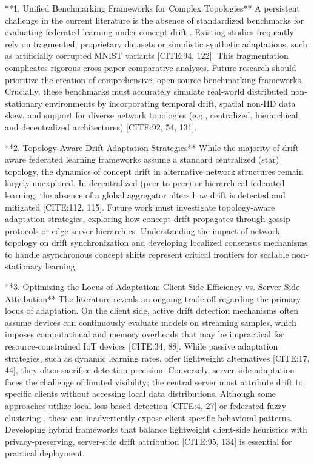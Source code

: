 \documentclass[journal]{IEEEtran}
\begin{document}
**1. Unified Benchmarking Frameworks for Complex Topologies**
A persistent challenge in the current literature is the absence of standardized benchmarks for evaluating federated learning under concept drift \cite{Mahdi2025}. Existing studies frequently rely on fragmented, proprietary datasets or simplistic synthetic adaptations, such as artificially corrupted MNIST variants [CITE:94, 122]. This fragmentation complicates rigorous cross-paper comparative analyses. Future research should prioritize the creation of comprehensive, open-source benchmarking frameworks. Crucially, these benchmarks must accurately simulate real-world distributed non-stationary environments by incorporating temporal drift, spatial non-IID data skew, and support for diverse network topologies (e.g., centralized, hierarchical, and decentralized architectures) [CITE:92, 54, 131].

**2. Topology-Aware Drift Adaptation Strategies**
While the majority of drift-aware federated learning frameworks assume a standard centralized (star) topology, the dynamics of concept drift in alternative network structures remain largely unexplored. In decentralized (peer-to-peer) or hierarchical federated learning, the absence of a global aggregator alters how drift is detected and mitigated [CITE:112, 115]. Future work must investigate topology-aware adaptation strategies, exploring how concept drift propagates through gossip protocols or edge-server hierarchies. Understanding the impact of network topology on drift synchronization and developing localized consensus mechanisms to handle asynchronous concept shifts \cite{Benameur2025} represent critical frontiers for scalable non-stationary learning.

**3. Optimizing the Locus of Adaptation: Client-Side Efficiency vs. Server-Side Attribution**
The literature reveals an ongoing trade-off regarding the primary locus of adaptation. On the client side, active drift detection mechanisms often assume devices can continuously evaluate models on streaming samples, which imposes computational and memory overheads that may be impractical for resource-constrained IoT devices [CITE:34, 88]. While passive adaptation strategies, such as dynamic learning rates, offer lightweight alternatives [CITE:17, 44], they often sacrifice detection precision. Conversely, server-side adaptation faces the challenge of limited visibility; the central server must attribute drift to specific clients without accessing local data distributions. Although some approaches utilize local loss-based detection [CITE:4, 27] or federated fuzzy clustering \cite{Stallmann2024}, these can inadvertently expose client-specific behavioral patterns. Developing hybrid frameworks that balance lightweight client-side heuristics with privacy-preserving, server-side drift attribution [CITE:95, 134] is essential for practical deployment.
\end{document}
